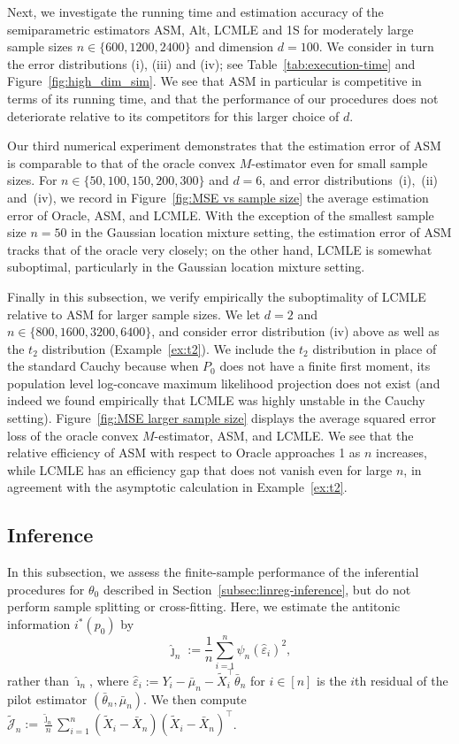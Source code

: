 \documentclass[a4paper]{article}
\theoremstyle{definition}
\begin{document}
Next, we investigate the running time and estimation accuracy of the semiparametric estimators ASM, Alt, LCMLE and 1S for moderately large sample sizes $n \in \{600, 1200, 2400\}$ and dimension $d = 100$. We consider in turn the error distributions (i), (iii) and (iv); see Table~\ref{tab:execution-time} and Figure~\ref{fig:high_dim_sim}.  We see that ASM in particular is competitive in terms of its running time, and that the performance of our procedures does not deteriorate relative to its competitors for this larger choice of $d$.

Our third numerical experiment demonstrates that the estimation error of ASM is comparable to that of the oracle convex $M$-estimator even for small sample sizes. For $n \in \{50, 100, 150, 200, 300\}$ and $d = 6$, and error distributions~(i),~(ii) and~(iv), we record in Figure~\ref{fig:MSE vs sample size} the average estimation error of Oracle, ASM, and LCMLE.  With the exception of the smallest sample size $n = 50$ in the Gaussian location mixture setting, the estimation error of ASM tracks that of the oracle very closely; on the other hand, LCMLE is somewhat suboptimal, particularly in the Gaussian location mixture setting.

Finally in this subsection, we verify empirically the suboptimality of LCMLE relative to ASM for larger sample sizes. We let $d = 2$ and $n \in \{800, 1600, 3200, 6400\}$, and consider error distribution (iv) above as well as the $t_2$ distribution (Example~\ref{ex:t2}).  We include the $t_2$ distribution in place of the standard Cauchy because when $P_0$ does not have a finite first moment, its population level log-concave maximum likelihood projection does not exist (and indeed we found empirically that LCMLE was highly unstable in the Cauchy setting). Figure~\ref{fig:MSE larger sample size} displays the average squared error loss of the oracle convex $M$-estimator, ASM, and LCMLE. We see that the relative efficiency of ASM with respect to Oracle approaches 1 as $n$ increases, while LCMLE has an efficiency gap that does not vanish even for large $n$, in agreement with the asymptotic calculation in Example~\ref{ex:t2}. 

\subsection{Inference}

In this subsection, we assess the finite-sample performance of the inferential  procedures for $\theta_0$ described in Section~\ref{subsec:linreg-inference}, but do not perform sample splitting or cross-fitting. Here, we estimate the antitonic information $i^*(p_0)$ by
\[
\hat{\jmath}_n := \frac{1}{n}\sum_{i=1}^n \hat{\psi}_n(\hat{\varepsilon}_i)^2,
\]
rather than $\hat{\imath}_n$, where $\hat{\varepsilon}_i := Y_i - \bar{\mu}_n - \tilde{X}_i^\top \bar{\theta}_n$ for $i \in [n]$ is the $i$th residual of the pilot estimator $(\bar{\theta}_n,\bar{\mu}_n)$. We then compute $\tilde{\mathcal{J}}_n := \frac{\tilde{\jmath}_n}{n} \sum_{i=1}^n (\tilde{X}_i - \bar{X}_n) (\tilde{X}_i - \bar{X}_n)^\top$. 
\end{document}
